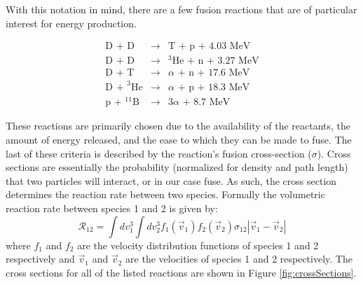 With this notation in mind, there are a few fusion reactions that are of particular interest for energy production. 

\begin{eqnarray}
		\text{D + D} &\rightarrow& \text{T + p + 4.03 MeV}  \label{eq:DDp}\\
		\text{D + D} &\rightarrow& ^3\text{He + n + 3.27 MeV} \label{eq:DDn}\\
		\text{D + T} &\rightarrow& \alpha \text{ + n + 17.6 MeV} \label{eq:DTn}\\
		\text{D + } ^3\text{He} &\rightarrow& \alpha \text{ + p + 18.3 MeV} \label{eq:D3Hep} \\
		\text{p + } ^{11}\text{B} &\rightarrow& 3\alpha	\text{ + 8.7 MeV} \label{eq:p11B}		
\end{eqnarray}

These reactions are primarily chosen due to the availability of the reactants, the amount of energy released, and the ease to which they can be made to fuse. The last of these criteria is described by the reaction's fusion cross-section ($\sigma$). Cross sections are essentially the probability (normalized for density and path length) that two particles will interact, or in our case fuse. As such, the cross section determines the reaction rate between two species. Formally the volumetric reaction rate between species 1 and 2 is given by:  
%
\begin{equation}
	\mathcal{R}_{12} = \int dv_1^3 \int dv_2^3 f_1(\vec{v}_1) f_2(\vec{v}_2) \sigma_{12} \left|\vec{v}_1 - \vec{v}_2\right|
	\label{eq:reactionRate}
\end{equation}
%
where $f_1$ and $f_2$ are the velocity distribution functions of species 1 and 2 respectively and $\vec{v}_1$ and $\vec{v}_2$ are the velocities of species 1 and 2 respectively. The cross sections for all of the listed reactions are shown in Figure \ref{fig:crossSections}. 

